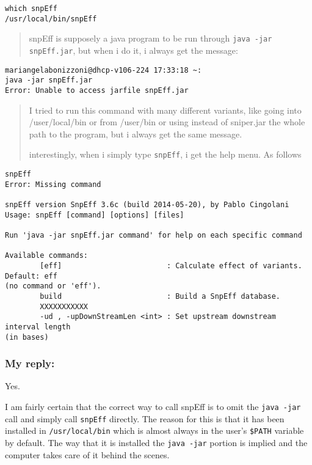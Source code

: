 \documentclass[letterpaper]{scrartcl}
\begin{document}
\begin{verbatim}
which snpEff
/usr/local/bin/snpEff
\end{verbatim}

\begin{quote}
snpEff is supposely a java program to be run through
\texttt{java -jar snpEff.jar}, but when i do it, i always get the
message:
\end{quote}

\begin{verbatim}
mariangelabonizzoni@dhcp-v106-224 17:33:18 ~:
java -jar snpEff.jar
Error: Unable to access jarfile snpEff.jar
\end{verbatim}

\begin{quote}
I tried to run this command with many different variants, like going
into /user/local/bin or from /user/bin or using instead of sniper.jar
the whole path to the program, but i always get the same message.

interestingly, when i simply type \texttt{snpEff}, i get the help menu.
As follows
\end{quote}

\begin{verbatim}
snpEff
Error: Missing command

snpEff version SnpEff 3.6c (build 2014-05-20), by Pablo Cingolani
Usage: snpEff [command] [options] [files]

Run 'java -jar snpEff.jar command' for help on each specific command

Available commands:
        [eff]                        : Calculate effect of variants. Default: eff
(no command or 'eff').
        build                        : Build a SnpEff database.
        XXXXXXXXXXX
        -ud , -upDownStreamLen <int> : Set upstream downstream interval length
(in bases)
\end{verbatim}

\subsubsection{My reply:}\label{my-reply}

Yes.

I am fairly certain that the correct way to call snpEff is to omit the
\texttt{java -jar} call and simply call \texttt{snpEff} directly. The
reason for this is that it has been installed in \texttt{/usr/local/bin}
which is almost always in the user's \texttt{\$PATH} variable by
default. The way that it is installed the \texttt{java -jar} portion is
implied and the computer takes care of it behind the scenes.
\end{document}
